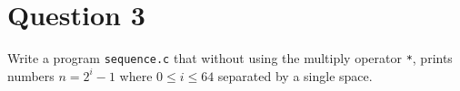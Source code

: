 
\section*{Question 3}

Write a program \texttt{sequence.c} that without using the multiply operator \texttt{*}, prints numbers $n = 2^{i}-1$ where $0 \leq i \leq 64$ separated by a single space.
